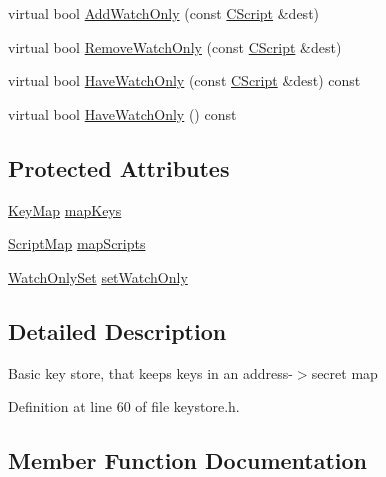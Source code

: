\begin{DoxyCompactItemize}
\item 
virtual bool \hyperlink{class_c_basic_key_store_a2417d0ae4e654c88cf47a1ba5f71b5a3}{Add\+Watch\+Only} (const \hyperlink{class_c_script}{C\+Script} \&dest)
\item 
virtual bool \hyperlink{class_c_basic_key_store_a20c0eccf943d6d16e24c6e2fb63fb527}{Remove\+Watch\+Only} (const \hyperlink{class_c_script}{C\+Script} \&dest)
\item 
virtual bool \hyperlink{class_c_basic_key_store_a51d4c7e95cb782d749939d01612926f7}{Have\+Watch\+Only} (const \hyperlink{class_c_script}{C\+Script} \&dest) const 
\item 
virtual bool \hyperlink{class_c_basic_key_store_a3d89af8d9e9e0bb4eb90f331a638ff6d}{Have\+Watch\+Only} () const 
\end{DoxyCompactItemize}
\subsection*{Protected Attributes}
\begin{DoxyCompactItemize}
\item 
\hyperlink{keystore_8h_a4dc9f57afc8615aef701e40cf20d024f}{Key\+Map} \hyperlink{class_c_basic_key_store_ac520003e5c3d863bf71fde247c6e0672}{map\+Keys}
\item 
\hyperlink{keystore_8h_afb22a3e7e10e8048d2fb3fb72fe38345}{Script\+Map} \hyperlink{class_c_basic_key_store_a8e9fa81382129c1535a0ee7b0d9c8f3b}{map\+Scripts}
\item 
\hyperlink{keystore_8h_a501c3a7b9932bbc7168dc7b3fc5d149e}{Watch\+Only\+Set} \hyperlink{class_c_basic_key_store_ac3391cb491e315403ad9af6afd1313da}{set\+Watch\+Only}
\end{DoxyCompactItemize}


\subsection{Detailed Description}
Basic key store, that keeps keys in an address-\/$>$secret map 

Definition at line 60 of file keystore.\+h.



\subsection{Member Function Documentation}
\hypertarget{class_c_basic_key_store_a56249ce3540398999cd397eeb662e836}{}
